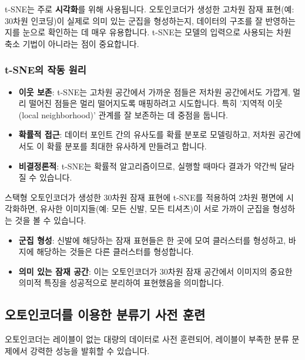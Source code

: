 \documentclass[11pt,a4paper]{article}
\begin{document}
\begin{tcolorbox}[title=\textbf{t-SNE의 목적}]
t-SNE는 주로 \textbf{시각화}를 위해 사용됩니다. 오토인코더가 생성한 고차원 잠재 표현(예: 30차원 인코딩)이 실제로 의미 있는 군집을 형성하는지, 데이터의 구조를 잘 반영하는지를 눈으로 확인하는 데 매우 유용합니다. t-SNE는 모델의 입력으로 사용되는 차원 축소 기법이 아니라는 점이 중요합니다.
\end{tcolorbox}

\subsubsection{t-SNE의 작동 원리}
\begin{itemize}
    \item \textbf{이웃 보존}: t-SNE는 고차원 공간에서 가까운 점들은 저차원 공간에서도 가깝게, 멀리 떨어진 점들은 멀리 떨어지도록 매핑하려고 시도합니다. 특히 '지역적 이웃(local neighborhood)' 관계를 잘 보존하는 데 중점을 둡니다.
    \item \textbf{확률적 접근}: 데이터 포인트 간의 유사도를 확률 분포로 모델링하고, 저차원 공간에서도 이 확률 분포를 최대한 유사하게 만들려고 합니다.
    \item \textbf{비결정론적}: t-SNE는 확률적 알고리즘이므로, 실행할 때마다 결과가 약간씩 달라질 수 있습니다.
\end{itemize}

\begin{examplebox}
스택형 오토인코더가 생성한 30차원 잠재 표현에 t-SNE를 적용하여 2차원 평면에 시각화하면, 유사한 이미지들(예: 모든 신발, 모든 티셔츠)이 서로 가까이 군집을 형성하는 것을 볼 수 있습니다.
\begin{itemize}
    \item \textbf{군집 형성}: 신발에 해당하는 잠재 표현들은 한 곳에 모여 클러스터를 형성하고, 바지에 해당하는 것들은 다른 클러스터를 형성합니다.
    \item \textbf{의미 있는 잠재 공간}: 이는 오토인코더가 30차원 잠재 공간에서 이미지의 중요한 의미적 특징을 성공적으로 분리하여 표현했음을 의미합니다.
\end{itemize}
\end{examplebox}

\subsection{오토인코더를 이용한 분류기 사전 훈련}
오토인코더는 레이블이 없는 대량의 데이터로 사전 훈련되어, 레이블이 부족한 분류 문제에서 강력한 성능을 발휘할 수 있습니다.
\end{document}
